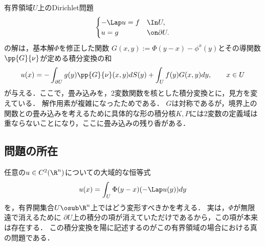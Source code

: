 \documentclass[uplatex,dvipdfmx]{jsreport}
\begin{document}
\begin{tcolorbox}[colframe=ForestGreen, colback=ForestGreen!10!white,breakable,colbacktitle=ForestGreen!40!white,coltitle=black,fonttitle=\bfseries\sffamily,
title=]
    有界領域$U$上のDirichlet問題
    \[\begin{cases}
        -\Lap u=f&\In U,\\
        u=g&\on\partial U.
    \end{cases}\]
    の解は，基本解$\Phi$を修正した関数
    $G(x,y):=\Phi(y-x)-\phi^x(y)$とその導関数$\pp{G}{\nu}$が定める積分変換の和
    \[u(x)=-\int_{\partial U}g(y)\pp{G}{\nu}(x,y)dS(y)+\int_Uf(y)G(x,y)dy,\qquad x\in U\]
    が与える．ここで，畳み込みを，2変数関数を核とした積分変換とに，見方を変えている．
    解作用素が複雑になったためである．
    $G$は対称であるが，境界上の関数との畳み込みを考えるために具体的な形の積分核$K,P$には2変数の定義域は重ならないことになり，ここに畳み込みの残り香がある．
\end{tcolorbox}

\subsection{問題の所在}

\begin{tcolorbox}[colframe=ForestGreen, colback=ForestGreen!10!white,breakable,colbacktitle=ForestGreen!40!white,coltitle=black,fonttitle=\bfseries\sffamily,
title=]
    任意の$u\in C^2(\R^n)$についての大域的な恒等式
    \[u(x)=\int_U\Phi(y-x)(-\Lap u(y))dy\]
    を，有界開集合$U\osub\R^n$上ではどう変形すべきかを考える．
    実は，$\Phi$が無限遠で消えるために
    $\partial U$上の積分の項が消えていただけであるから，この項が本来は存在する．
    この積分変換を陽に記述するのがこの有界領域の場合における真の問題である．
\end{tcolorbox}
\end{document}
